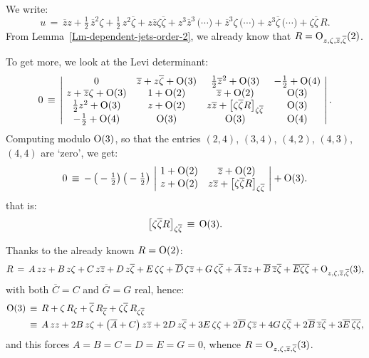 \documentclass[12pt,twoside,leqno,openany]{amsart}
\begin{document}
\proof
We write:
\[
u
\,=\,
\overline{z}z
+
\tfrac{1}{2}\,
\overline{z}^2\zeta
+
\tfrac{1}{2}\,
z^2\overline{\zeta}
+
z\overline{z}\zeta\overline{\zeta}
+
z^3\overline{z}^3\,\big(\cdots\big)
+
\overline{z}^3\zeta\,\big(\cdots\big)
+
z^3\overline{\zeta}\,\big(\cdots\big)
+
\zeta\overline{\zeta}\,R.
\]
From Lemma~{\ref{Lm-dependent-jets-order-2}}, we already
know that $R = {\rm O}_{z, \zeta, \overline{z}, 
\overline{\zeta}} (2)$. 

To get more, we look at the Levi determinant:
\[
0
\,\equiv\,
\left\vert\!
\begin{array}{cccc}
0 & \overline{z}+z\overline{\zeta}+{\rm O}(3) &
\frac{1}{2}\overline{z}^2+{\rm O}(3) &
-\frac{1}{2}+{\rm O}(4)
\\
z+\overline{z}\zeta+{\rm O}(3) & 1+{\rm O}(2) &
\overline{z}+{\rm O}(2) & {\rm O}(3)
\\
\frac{1}{2}z^2+{\rm O}(3) & z+{\rm O}(2) &
z\overline{z}+\big[\zeta\overline{\zeta}R\big]_{\zeta\overline{\zeta}}
& {\rm O}(3)
\\
-\frac{1}{2}+{\rm O}(4) & {\rm O}(3) & {\rm O}(3) & {\rm O}(4)
\end{array}
\!\right\vert.
\]
Computing modulo ${\rm O}(3)$, so that the entries
$(2,4)$, $(3,4)$, $(4,2)$, $(4,3)$, $(4,4)$ are
`zero', we get:
\[
0
\,\equiv\,
-\,\big(-\tfrac{1}{2}\big)\,\big(-\tfrac{1}{2}\big)\,
\left\vert\!
\begin{array}{cc}
1+{\rm O}(2) & \overline{z}+{\rm O}(2)
\\
z+{\rm O}(2) & z\overline{z}+
\big[\zeta\overline{\zeta}R\big]_{\zeta\overline{\zeta}}
\end{array}
\!\right\vert
+
{\rm O}(3).
\]
that is:
\[
\big[\zeta\overline{\zeta}R\big]_{\zeta\overline{\zeta}}
\,\equiv\,
{\rm O}(3).
\]

Thanks to the already known $R = {\rm O}(2)$:
\[
R
\,=\,
A\,zz+B\,z\zeta+C\,z\overline{z}+D\,z\overline{\zeta}
+
E\,\zeta\zeta+\overline{D}\,\zeta\overline{z}+G\,\zeta\overline{\zeta}
+
\overline{A}\,\overline{z}z+\overline{B}\,\overline{z}\overline{\zeta}
+
\overline{E}\overline{\zeta}\overline{\zeta}
+
{\rm O}_{z,\zeta,\overline{z},\overline{\zeta}}(3),
\]
with both $\overline{C} = C$ and $\overline{G} = G$ real, hence:
\[
\aligned
{\rm O}(3)
&
\,\equiv\,
R
+
\zeta\,R_\zeta
+
\overline{\zeta}\,
R_{\overline{\zeta}}
+
\zeta\overline{\zeta}\,
R_{\zeta\overline{\zeta}}
\\
&
\,\equiv\,
A\,zz
+
2B\,z\zeta
+
\big(\overline{A}+C\big)\,
z\overline{z}
+
2D\,z\overline{\zeta}
+
3E\,\zeta\zeta
+
2\overline{D}\,\zeta\overline{z}
+
4G\,\zeta\overline{\zeta}
+
2\overline{B}\,\overline{z}\overline{\zeta}
+
3\overline{E}\,\overline{\zeta}\overline{\zeta},
\endaligned
\]
and this forces $A = B = C = D = E = G = 0$, whence
$R = {\rm O}_{z, \zeta, \overline{z}, \overline{\zeta}}(3)$.
\endproof
\end{document}
